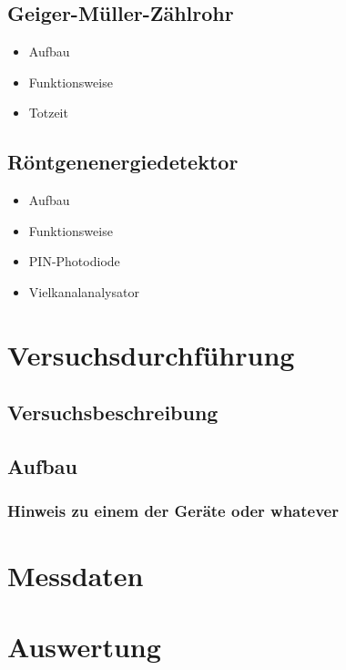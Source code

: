 \documentclass[10pt, a4paper]{article}
\begin{document}
\subsection{Geiger-Müller-Zählrohr}

\begin{itemize}
  \item Aufbau
  \item Funktionsweise
  \item Totzeit
\end{itemize}
  
\subsection{Röntgenenergiedetektor}

\begin{itemize}
  \item Aufbau
  \item Funktionsweise
  \item PIN-Photodiode
  \item Vielkanalanalysator
\end{itemize}



\section{Versuchsdurchführung}

\subsection{Versuchsbeschreibung}

\subsection{Aufbau}

\subsubsection{Hinweis zu einem der Geräte oder whatever}

\section{Messdaten}

\section{Auswertung}
\end{document}
